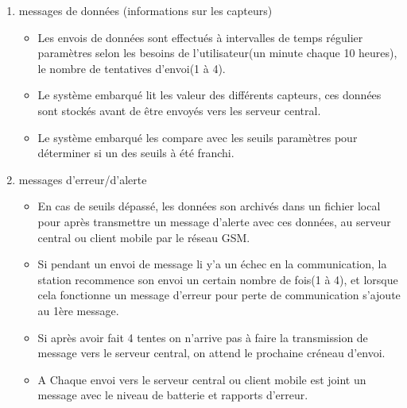 \documentclass [a4paper] {report}
\begin{document}
\begin{description}
\begin{enumerate}
	\item messages de données (informations sur les capteurs)\\
		\begin{itemize}
		\item Les envois de données sont effectués à intervalles de temps régulier paramètres selon les besoins de l'utilisateur(un minute chaque 10 heures), le nombre de tentatives d'envoi(1 à 4).\\
		\item Le système embarqué lit les valeur des différents capteurs, ces données sont stockés avant de être envoyés vers les serveur central.\\
		\item Le système embarqué les compare avec les seuils paramètres pour déterminer si un des seuils à été franchi. \\
		\end{itemize}

	\item messages d'erreur/d'alerte\\
		\begin{itemize}
		\item En cas de seuils dépassé, les données son archivés dans un fichier local pour après  transmettre un message d'alerte avec ces données, au serveur central ou client mobile par le réseau GSM. \\
		\item Si pendant un envoi de message li y'a un échec en la communication, la station recommence son envoi un certain nombre de fois(1 à 4), et lorsque cela fonctionne un message d'erreur pour perte de communication s'ajoute au 1ère message.\\
		\item Si après avoir fait 4 tentes on n'arrive pas à faire la transmission de message vers le serveur central, on attend le prochaine créneau d'envoi.\\
		\item A Chaque envoi vers le serveur central ou client mobile est joint un message avec le niveau de batterie et rapports d'erreur.\\
		\end{itemize}\hfill\\
	\end{enumerate}


\end{description}
\end{document}
